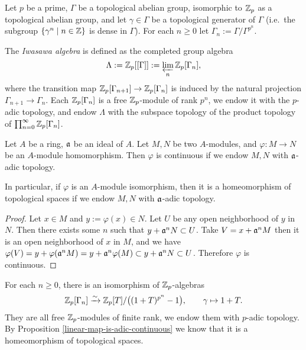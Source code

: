 Let $p$ be a prime,
$\Gamma$ be a topological abelian group, isomorphic to ${\mathbb {Z}}_p$
as a topological abelian group, and let $\gamma\in\Gamma$ be a topological generator
of $\Gamma$ (i.e.~the subgroup $\{\gamma^n\mid n\in{\mathbb {Z}}\}$ is dense in $\Gamma$).
For each $n\geq 0$ let $\Gamma_n:=\Gamma/\Gamma^{p^n}$.

\begin{definition}
\label{Iwasawa-alg-defn}
The \emph{Iwasawa algebra} is defined as the completed group algebra
$$
\Lambda:={\mathbb {Z}}_p[[\Gamma]]:=\varprojlim_n{\mathbb {Z}}_p[\Gamma_n],
$$
where the transition map ${\mathbb {Z}}_p[\Gamma_{n+1}]\to
{\mathbb {Z}}_p[\Gamma_n]$ is induced by the natural projection
$\Gamma_{n+1}\to\Gamma_n$.
Each ${\mathbb {Z}}_p[\Gamma_n]$ is a free ${\mathbb {Z}}_p$-module of rank $p^n$,
we endow it with the $p$-adic topology,
and endow $\Lambda$ with the subspace topology
of the product topology of $\prod_{n=0}^\infty{\mathbb {Z}}_p[\Gamma_n]$.
\end{definition}

\begin{prop}
\label{linear-map-is-adic-continuous}
Let $A$ be a ring, ${\mathfrak{a}}$ be an ideal of $A$.
Let $M,N$ be two $A$-modules,
and $\varphi:M\to N$ be an $A$-module homomorphism.
Then $\varphi$ is continuous if we endow $M,N$ with ${\mathfrak{a}}$-adic topology.

In particular, if $\varphi$ is an $A$-module isomorphism,
then it is a homeomorphism of topological spaces if we endow $M,N$ with ${\mathfrak{a}}$-adic topology.
\end{prop}

\begin{proof}
Let $x\in M$ and $y:=\varphi(x)\in N$.
Let $U$ be any open neighborhood of $y$ in $N$.
Then there exists some $n$ such that $y+{\mathfrak{a}}^nN\subset U$.
Take $V=x+{\mathfrak{a}}^nM$ then it is an open neighborhood of $x$ in $M$,
and we have $\varphi(V)=y+\varphi({\mathfrak{a}}^nM)=y+{\mathfrak{a}}^n\varphi(M)\subset y+{\mathfrak{a}}^nN\subset U$.
Therefore $\varphi$ is continuous.
\end{proof}

\begin{prop}
\label{Iwasawa-alg-isom-finite-level}
For each $n\geq 0$, there is an isomorphism of ${\mathbb {Z}}_p$-algebras
$$
{\mathbb {Z}}_p[\Gamma_n]\xrightarrow\sim{\mathbb {Z}}_p[T]/\big((1+T)^{p^n}-1\big),\qquad
\gamma\mapsto 1+T.
$$
They are all free ${\mathbb {Z}}_p$-modules of finite rank,
we endow them with $p$-adic topology.
By Proposition \ref{linear-map-is-adic-continuous}
we know that it is a homeomorphism of topological spaces.
\end{prop}

